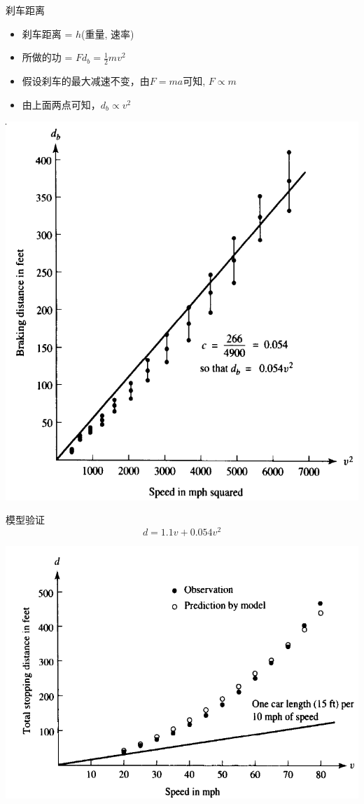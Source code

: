 \documentclass[mathserif]{beamer}
\begin{document}
\begin{frame}{刹车距离}

  \begin{itemize}
  \item 刹车距离 = $h$(重量, 速率)
  \item 所做的功 = $Fd_b=\frac{1}{2}mv^2$
  \item 假设刹车的最大减速不变，由$F=ma$可知, $F \propto m$
  \item 由上面两点可知，$d_b \propto v^2$
  \end{itemize}

  \begin{center}
    \includegraphics[width=.4\textwidth{}]{db.png}
  \end{center}
  
\end{frame}

\begin{frame}{模型验证}
  \[
  d = 1.1v + 0.054v^2
  \]

  \begin{center}
    \includegraphics[width=.6\textwidth{}]{dcomp.png}
  \end{center}
\end{frame}
\end{document}
